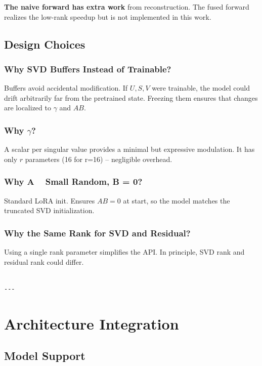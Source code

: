 \textbf{The naive forward has extra work} from reconstruction. The fused forward 
realizes the low-rank speedup but is not implemented in this work.

\subsection{Design Choices}

\subsubsection{Why SVD Buffers Instead of Trainable?}

Buffers avoid accidental modification. If $U, S, V$ were trainable, the model 
could drift arbitrarily far from the pretrained state. Freezing them ensures 
that changes are localized to $\gamma$ and $AB$.

\subsubsection{Why $\gamma$?}

A scalar per singular value provides a minimal but expressive modulation. 
It has only $r$ parameters (16 for r=16) -- negligible overhead.

\subsubsection{Why A ~ Small Random, B = 0?}

Standard LoRA init. Ensures $AB = 0$ at start, so the model matches the 
truncated SVD initialization.

\subsubsection{Why the Same Rank for SVD and Residual?}

Using a single rank parameter simplifies the API. In principle, SVD rank and 
residual rank could differ.
\begin{lstlisting}

---
\end{lstlisting}


\section{Architecture Integration}

\subsection{Model Support}

